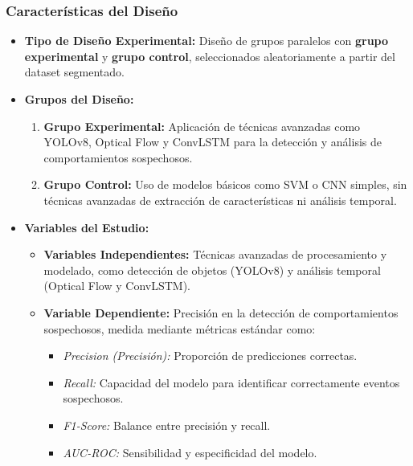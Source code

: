 \documentclass[listof=nochaptergap,12pt,times,authoryear]{report}
\begin{document}
\subsubsection{Características del Diseño}
\begin{itemize}
    \item \textbf{Tipo de Diseño Experimental:} Diseño de grupos paralelos con \textbf{grupo experimental} y \textbf{grupo control}, seleccionados aleatoriamente a partir del dataset segmentado.
    \item \textbf{Grupos del Diseño:}
    \begin{enumerate}
        \item \textbf{Grupo Experimental:} 
        Aplicación de técnicas avanzadas como YOLOv8, Optical Flow y ConvLSTM para la detección y análisis de comportamientos sospechosos.
        \item \textbf{Grupo Control:} 
        Uso de modelos básicos como SVM o CNN simples, sin técnicas avanzadas de extracción de características ni análisis temporal.
    \end{enumerate}
    \item \textbf{Variables del Estudio:}
    \begin{itemize}
        \item \textbf{Variables Independientes:} Técnicas avanzadas de procesamiento y modelado, como detección de objetos (YOLOv8) y análisis temporal (Optical Flow y ConvLSTM).
        \item \textbf{Variable Dependiente:} Precisión en la detección de comportamientos sospechosos, medida mediante métricas estándar como:
        \begin{itemize}
            \item \textit{Precision (Precisión):} Proporción de predicciones correctas.
            \item \textit{Recall:} Capacidad del modelo para identificar correctamente eventos sospechosos.
            \item \textit{F1-Score:} Balance entre precisión y recall.
            \item \textit{AUC-ROC:} Sensibilidad y especificidad del modelo.
        \end{itemize}
    \end{itemize}
\end{itemize}
\end{document}
